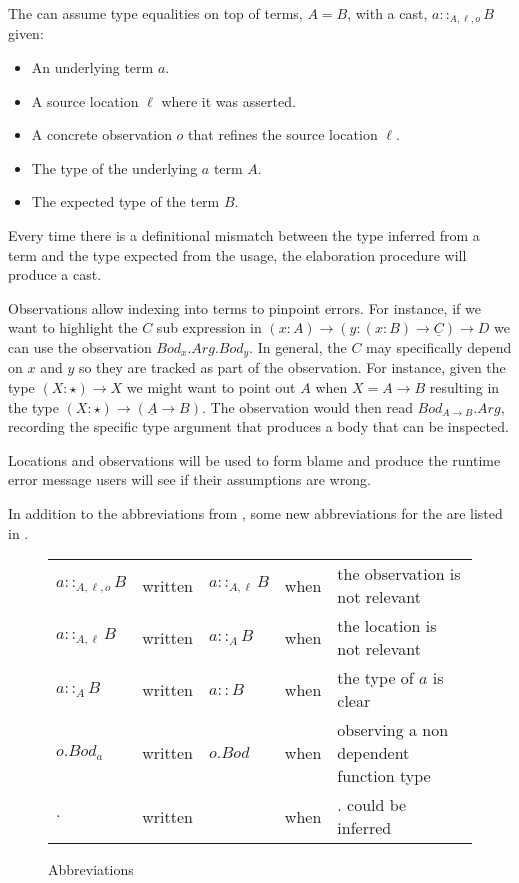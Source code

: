 The \clang{} can assume type equalities on top of terms, $A=B$, with a cast, $a::_{A,\ensuremath{\ell},o}B$ given:
\begin{itemize}
\item An underlying term $a$.
\item A source location $\ell$ where it was asserted.
\item A concrete observation $o$ that refines the source location $\ell$.
\item The type of the underlying $a$ term $A$.
\item The expected type of the term $B$.
\end{itemize}
Every time there is a definitional mismatch between the type inferred from a term and the type expected from the usage, the elaboration procedure will produce a cast.
 
Observations allow indexing into terms to pinpoint errors.
For instance, if we want to highlight the $C$ sub expression in $\left(x:A\right)\rightarrow\left(y:\left(x:B\right)\rightarrow\underline{C}\right)\rightarrow D$ we can use the observation $Bod_{x}.Arg.Bod_{y}$.
In general, the $C$ may specifically depend on $x$ and $y$ so they are tracked as part of the observation.
For instance, given the type $\left(X:\star\right)\rightarrow X$ we might want to point out $A$ when $X=A\rightarrow B$ resulting in the type $\left(X:\star\right)\rightarrow\left(\underline{A}\rightarrow B\right)$.
The observation would then read $Bod_{A\rightarrow B}.Arg$, recording the specific type argument that produces a body that can be inspected.
 
Locations and observations will be used to form blame and produce the runtime error message users will see if their assumptions are wrong.
 
In addition to the abbreviations from , some new abbreviations for the \clang{} are listed in .

\begin{figure}
\begin{tabular}{lclll}
$a::_{A,\ensuremath{\ell},o}B$ & written & $a::_{A,\ensuremath{\ell}}B$ & when & the observation is not relevant\tabularnewline
$a::_{A,\ensuremath{\ell}}B$ & written & $a::_{A}B$ & when & the location is not relevant\tabularnewline
$a::_{A}B$ & written & $a::B$ & when & the type of $a$ is clear\tabularnewline
$o.Bod_a$ & written & $o.Bod$ & when & observing a non dependent function type\tabularnewline
$.$ & written &  & when & $.$ could be inferred \tabularnewline
\end{tabular}

\caption{\CLang{} Abbreviations}
\label{fig:cast-pre-syntax-abrev}
\end{figure}

